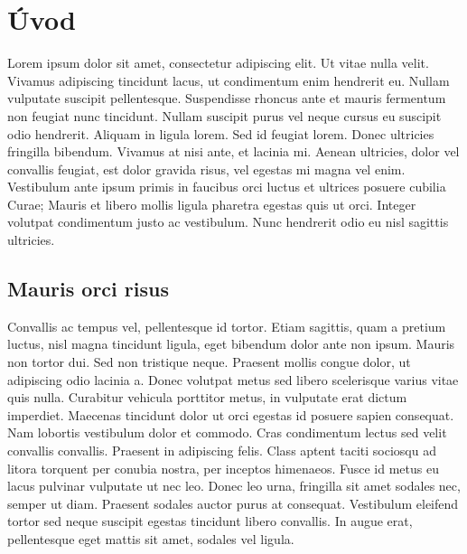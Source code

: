 \documentclass[11pt,a4paper,oneside]{book}
\begin{document}

\newpage

\tableofcontents

\newpage

\chapter{Úvod}

Lorem ipsum dolor sit amet, consectetur adipiscing elit. Ut vitae nulla velit. Vivamus adipiscing tincidunt lacus, ut condimentum enim hendrerit eu.
Nullam vulputate suscipit pellentesque. Suspendisse rhoncus ante et mauris fermentum non feugiat nunc tincidunt. Nullam suscipit purus vel neque cursus
eu suscipit odio hendrerit. Aliquam in ligula lorem. Sed id feugiat lorem. Donec ultricies fringilla bibendum. Vivamus at nisi ante, et lacinia mi.
Aenean ultricies, dolor vel convallis feugiat, est dolor gravida risus, vel egestas mi magna vel enim. Vestibulum ante ipsum primis in faucibus orci
luctus et ultrices posuere cubilia Curae; Mauris et libero mollis ligula pharetra egestas quis ut orci. Integer volutpat condimentum justo ac vestibulum.
Nunc hendrerit odio eu nisl sagittis ultricies.

\section{Mauris orci risus}

Convallis ac tempus vel, pellentesque id tortor. Etiam sagittis, quam a pretium luctus, nisl magna tincidunt ligula, eget bibendum dolor ante non ipsum.
Mauris non tortor dui. Sed non tristique neque. Praesent mollis congue dolor, ut adipiscing odio lacinia a. Donec volutpat metus sed libero scelerisque
varius vitae quis nulla. Curabitur vehicula porttitor metus, in vulputate erat dictum imperdiet. Maecenas tincidunt dolor ut orci egestas id posuere sapien
consequat. Nam lobortis vestibulum dolor et commodo. Cras condimentum lectus sed velit convallis convallis. Praesent in adipiscing felis.
Class aptent taciti sociosqu ad litora torquent per conubia nostra, per inceptos himenaeos. Fusce id metus eu lacus pulvinar vulputate ut nec leo. Donec leo urna,
fringilla sit amet sodales nec, semper ut diam. Praesent sodales auctor purus at consequat. Vestibulum eleifend tortor sed neque suscipit egestas tincidunt libero
convallis. In augue erat, pellentesque eget mattis sit amet, sodales vel ligula.
\end{document}
